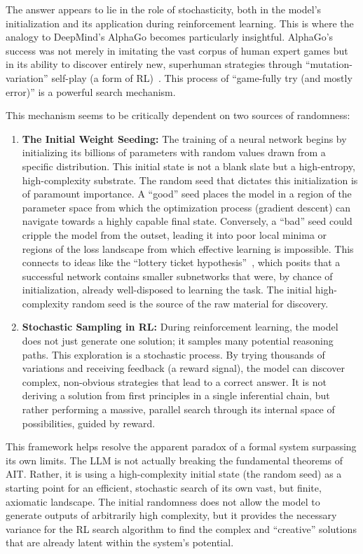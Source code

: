 \documentclass[%
  reprint,
  superscriptaddress,
  showpacs,
  showkeys,
  amsmath,amssymb,
  pra,
  longbibliography,
  floatfix,
  x11names
]{revtex4-2}
\begin{document}
The answer appears to lie in the role of stochasticity,
both in the model's initialization and its application during reinforcement learning.
This is where the analogy to DeepMind's AlphaGo becomes particularly insightful.
AlphaGo's success was not merely in imitating the vast corpus of human expert games
but in its ability to discover entirely new, superhuman strategies through ``mutation-variation'' self-play
(a form of RL)~\cite{Silver-2017}. This process of ``game-fully try (and mostly error)''
is a powerful search mechanism.

This mechanism seems to be critically dependent on two sources of randomness:
\begin{enumerate}
    \item \textbf{The Initial Weight Seeding:} The training of a neural network begins by initializing its billions of parameters with random values drawn from a specific distribution. This initial state is not a blank slate but a high-entropy, high-complexity substrate. The random seed that dictates this initialization is of paramount importance. A ``good'' seed places the model in a region of the parameter space from which the optimization process (gradient descent) can navigate towards a highly capable final state. Conversely, a ``bad'' seed could cripple the model from the outset, leading it into poor local minima or regions of the loss landscape from which effective learning is impossible. This connects to ideas like the ``lottery ticket hypothesis''~\cite{frankle2018the}, which posits that a successful network contains smaller subnetworks that were, by chance of initialization, already well-disposed to learning the task. The initial high-complexity random seed is the source of the raw material for discovery.

    \item \textbf{Stochastic Sampling in RL:} During reinforcement learning, the model does not just generate one solution; it samples many potential reasoning paths. This exploration is a stochastic process. By trying thousands of variations and receiving feedback (a reward signal), the model can discover complex, non-obvious strategies that lead to a correct answer. It is not deriving a solution from first principles in a single inferential chain, but rather performing a massive, parallel search through its internal space of possibilities, guided by reward.
\end{enumerate}


This framework helps resolve the apparent paradox of a formal system surpassing its own limits.
The LLM is not actually breaking the fundamental theorems of AIT. Rather, it is using a high-complexity initial state (the random seed) as a starting point for an efficient, stochastic search of its own vast, but finite, axiomatic landscape. The initial randomness does not allow the model to generate outputs of arbitrarily high complexity, but it provides the necessary variance for the RL search algorithm to find the complex and ``creative'' solutions that are already latent within the system's potential.
\end{document}
